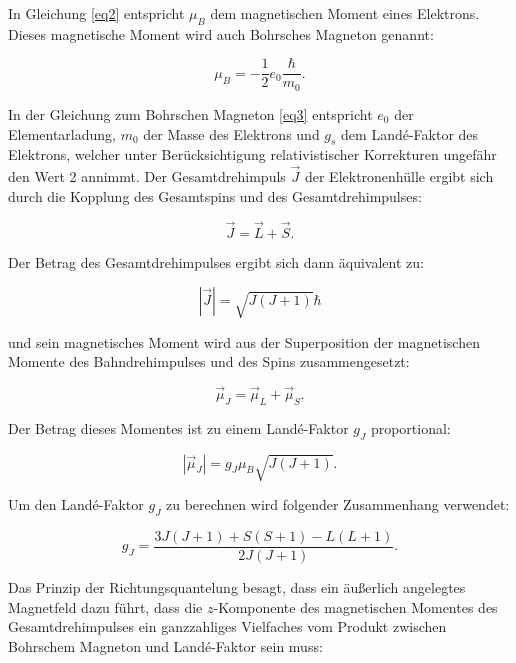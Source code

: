 In Gleichung \ref{eq2} entspricht $\mu_B$ dem magnetischen Moment eines Elektrons. 
Dieses magnetische Moment wird auch Bohrsches Magneton genannt:

\begin{equation}
    \mu_B = - \frac{1}{2}e_0\frac{\hbar}{m_0}.
    \label{eq3}
\end{equation}

In der Gleichung zum Bohrschen Magneton \ref{eq3} entspricht $e_0$ der 
Elementarladung, $m_0$ der Masse des Elektrons und $g_s$ dem Landé-Faktor
des Elektrons, welcher unter Berücksichtigung relativistischer Korrekturen 
ungefähr den Wert 2 annimmt.
Der Gesamtdrehimpuls $\vec{J}$ der Elektronenhülle ergibt sich durch die 
Kopplung des Gesamtspins und des Gesamtdrehimpulses:

\begin{equation}
    \vec{J} = \vec{L} + \vec{S}.
    \label{eq4}
\end{equation}

Der Betrag des Gesamtdrehimpulses ergibt sich dann äquivalent zu:

\begin{equation}
    |\vec{J}| = \sqrt{J(J+1)}\hbar
    \label{eq5}
\end{equation}

und sein magnetisches Moment wird aus der Superposition der magnetischen Momente des
Bahndrehimpulses und des Spins zusammengesetzt:

\begin{equation}
    \vec{\mu}_J = \vec{\mu}_L + \vec{\mu}_S.
    \label{eq6}
\end{equation}

Der Betrag dieses Momentes ist zu einem Landé-Faktor $g_J$ proportional:

\begin{equation}
    |\vec{\mu}_J| = g_J \mu_B\sqrt{J(J+1)}.
    \label{eq7}
\end{equation}

Um den Landé-Faktor $g_J$ zu berechnen wird folgender Zusammenhang verwendet:

\begin{equation}
    g_J = \frac{3J(J+1) + S(S+1) - L(L+1)}{2J(J+1)}.
    \label{len5}
\end{equation}

Das Prinzip der Richtungsquantelung besagt, dass ein äußerlich angelegtes 
Magnetfeld dazu führt, dass die $z$-Komponente des magnetischen Momentes des 
Gesamtdrehimpulses ein ganzzahliges Vielfaches vom Produkt zwischen 
Bohrschem Magneton und Landé-Faktor sein muss:

